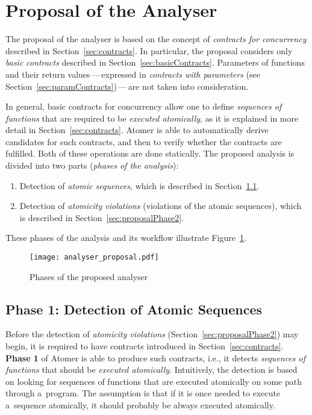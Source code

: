 \section{Proposal of the Analyser}
\label{sec:proposal}

The proposal of the analyser is based on the concept of \emph{contracts
for concurrency} described in Section~\ref{sec:contracts}. In particular,
the proposal considers only \emph{basic contracts} described in
Section~\ref{sec:basicContracts}. Parameters of functions and their
return values\,---\,expressed in \emph{contracts with parameters}
(see Section~\ref{sec:paramContracts})\,---\,are not taken into
consideration.

In general, basic contracts for concurrency allow one to define
\emph{sequences of functions} that are required to be \emph{executed
atomically}, as it is explained in more detail in Section~\ref{sec:contracts}.
Atomer is able to automatically derive candidates for such contracts, and
then to verify whether the contracts are fulfilled. Both of these operations
are done statically. The proposed analysis is divided into two parts
(\emph{phases of the analysis}):
\begin{enumerate}[label={\textbf{Phase \arabic*}:}, leftmargin=6em]
    \item
        Detection of \emph{atomic sequences}, which is described in
        Section~\ref{sec:proposalPhase1}.

    \item
        Detection of \emph{atomicity violations} (violations of the atomic
        sequences), which is described in Section~\ref{sec:proposalPhase2}.
\end{enumerate}
These phases of the analysis and its workflow illustrate
Figure~\ref{fig:analyserPhases}.

\begin{figure}[hbt]
    \centering
    \texttt{[image: analyser\_proposal.pdf]}
    \caption{Phases of the proposed analyser}
    \label{fig:analyserPhases}
\end{figure}


\subsection{Phase 1: Detection of Atomic Sequences}
\label{sec:proposalPhase1}

Before the detection of \emph{atomicity violations}
(Section~\ref{sec:proposalPhase2}) may begin, it is required to have
contracts introduced in Section~\ref{sec:contracts}. \textbf{Phase 1}
of Atomer is able to produce such contracts, i.e., it detects
\emph{sequences of functions} that should be \emph{executed atomically}.
Intuitively, the detection is based on looking for sequences of
functions that are executed atomically on some path through
a~program. The assumption is that if it is once needed to execute
a~sequence atomically, it should probably be always executed atomically.

